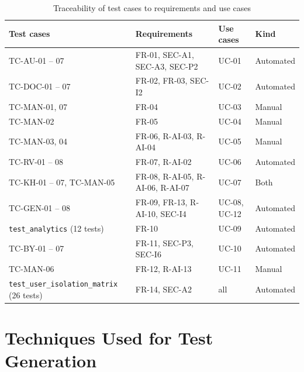\begin{table}[!htbp]
\centering
\caption{Traceability of test cases to requirements and use cases}\label{tab:trace}
\small\setlength{\tabcolsep}{4pt}
\begin{tabularx}{\textwidth}{@{}l X X l@{}}
\toprule
\textbf{Test cases} & \textbf{Requirements} & \textbf{Use cases} & \textbf{Kind}\\
\midrule
TC-AU-01 -- 07 & FR-01, SEC-A1, SEC-A3, SEC-P2 & UC-01 & Automated\\
TC-DOC-01 -- 07 & FR-02, FR-03, SEC-I2 & UC-02 & Automated\\
TC-MAN-01, 07 & FR-04 & UC-03 & Manual\\
TC-MAN-02 & FR-05 & UC-04 & Manual\\
TC-MAN-03, 04 & FR-06, R-AI-03, R-AI-04 & UC-05 & Manual\\
TC-RV-01 -- 08 & FR-07, R-AI-02 & UC-06 & Automated\\
TC-KH-01 -- 07, TC-MAN-05 & FR-08, R-AI-05, R-AI-06, R-AI-07 & UC-07 & Both\\
TC-GEN-01 -- 08 & FR-09, FR-13, R-AI-10, SEC-I4 & UC-08, UC-12 & Automated\\
\texttt{test\_analytics} (12 tests) & FR-10 & UC-09 & Automated\\
TC-BY-01 -- 07 & FR-11, SEC-P3, SEC-I6 & UC-10 & Automated\\
TC-MAN-06 & FR-12, R-AI-13 & UC-11 & Manual\\
\texttt{test\_user\_isolation\_matrix} (26 tests) & FR-14, SEC-A2 & all & Automated\\
\bottomrule
\end{tabularx}
\end{table}

\section{Techniques Used for Test Generation}

